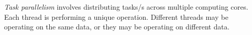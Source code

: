 \begin{definition}\label{def:Task_Parallelism}
  \emph{Task parallelism} involves distributing tasks/s across multiple computing cores.
  Each thread is performing a unique operation.
  Different threads may be operating on the same data, or they may be operating on different data.
\end{definition}






